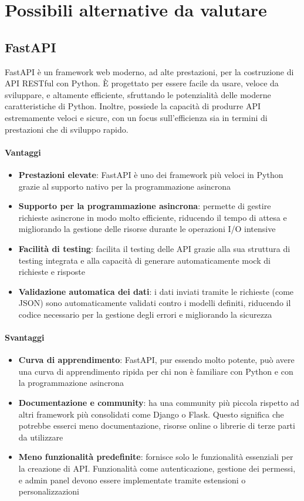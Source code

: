 \documentclass{article}
\begin{document}
\section{Possibili alternative da valutare}

\subsection{FastAPI}
FastAPI è un framework web moderno, ad alte prestazioni, per la 
costruzione di API RESTful con Python. È progettato per essere facile 
da usare, veloce da sviluppare, e altamente efficiente, sfruttando 
le potenzialità delle moderne caratteristiche di Python. Inoltre, 
possiede la capacità di produrre API estremamente veloci e sicure, 
con un focus sull'efficienza sia in termini di prestazioni che di 
sviluppo rapido.
\paragraph*{Vantaggi}
\begin{itemize}
    \item \textbf{Prestazioni elevate}: FastAPI è uno dei framework 
    più veloci in Python grazie al supporto nativo per la programmazione 
    asincrona
    \item \textbf{Supporto per la programmazione asincrona}: permette 
    di gestire richieste asincrone in modo molto efficiente, riducendo 
    il tempo di attesa e migliorando la gestione delle risorse durante 
    le operazioni I/O intensive
    \item \textbf{Facilità di testing}: facilita il testing delle API 
    grazie alla sua struttura di testing integrata e alla capacità di 
    generare automaticamente mock di richieste e risposte
    \item \textbf{Validazione automatica dei dati}: i dati inviati 
    tramite le richieste (come JSON) sono automaticamente validati 
    contro i modelli definiti, riducendo il codice necessario per la 
    gestione degli errori e migliorando la sicurezza
\end{itemize}
\paragraph*{Svantaggi}
\begin{itemize}
    \item \textbf{Curva di apprendimento}: FastAPI, pur essendo molto 
    potente, può avere una curva di apprendimento ripida per chi non è 
    familiare con Python e con la programmazione asincrona
    \item \textbf{Documentazione e community}: ha una community più 
    piccola rispetto ad altri framework più consolidati come Django o 
    Flask. Questo significa che potrebbe esserci meno documentazione, 
    risorse online o librerie di terze parti da utilizzare
    \item \textbf{Meno funzionalità predefinite}: fornisce solo le 
    funzionalità essenziali per la creazione di API. Funzionalità come 
    autenticazione, gestione dei permessi, e admin panel devono essere 
    implementate tramite estensioni o personalizzazioni
\end{itemize}
\end{document}
